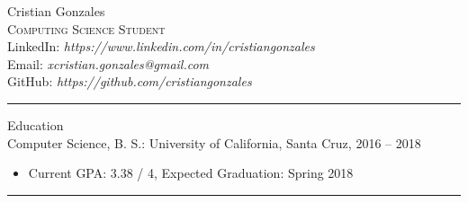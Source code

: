 \documentclass{res}
\begin{document}
\begin{resume}

{\Huge Cristian Gonzales}\\
\textsc{\large Computing Science Student}\\
LinkedIn: \textit{https://www.linkedin.com/in/cristiangonzales}\\
Email: \textit{xcristian.gonzales@gmail.com}\\
GitHub: \textit{https://github.com/cristiangonzales}\\

\hrule

{\huge Education}\\[2mm]
{\Large Computer Science, B. S.: University of California, Santa Cruz, 2016 -- 2018}\\
	\begin{itemize}
		\vspace{-3mm}
		\item Current GPA: 3.38 / 4, Expected Graduation: Spring 2018
	\end{itemize}
\vspace{-1mm}
\leavevmode

\hrule


\end{resume}
\end{document}
